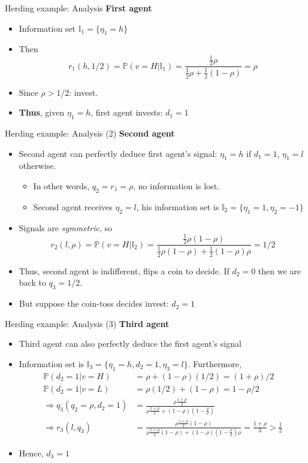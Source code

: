 \documentclass[english,10pt
,aspectratio=169
]{beamer}
\begin{document}
\begin{frame}{Herding example: Analysis}
	\textbf{First agent}
	\begin{itemize}
		\item Information set $\mathbb{I}_1=\{\eta_1=h\}$
		\item Then
		\[
			r_1(h,1/2) = \mathbb{P}(v=H|\mathbb{I}_1) = \frac{\frac{1}{2} \rho}{\frac{1}{2} \rho+\frac{1}{2} (1- \rho)} = \rho 
		\]
		\item Since $\rho>1/2$: invest.
		\item \textbf{Thus}, given $\eta_1=h$, first agent invests: $d_1=1$
	\end{itemize}
\end{frame}


\begin{frame}{Herding example: Analysis (2)}
	\textbf{Second agent}
	\begin{itemize}
		\item Second agent can perfectly deduce first agent's signal: $\eta_1=h$ if $d_1=1$, $\eta_1=l$ otherwise.
		\begin{itemize}
			\item In other words, $q_2 = r_1 = \rho$, no information is lost.
			\item Second agent receives $\eta_2=l$, his information set is $\mathbb{I}_2=\{\eta_1=1,\eta_2=-1\}$
		\end{itemize}
		\item Signals are \emph{symmetric}, so
		\[ r_2(l,\rho) = \mathbb{P}(v=H|\mathbb{I}_2) = \frac{\frac{1}{2} \rho(1-\rho)}{\frac{1}{2} \rho(1-\rho)+\frac{1}{2} (1-\rho)\rho} = 1/2 \]
		\item Thus, second agent is indifferent, flips a coin to decide. If $d_2 = 0$ then we are back to $q_3=1/2$.
		\item But suppose the coin-toss decides invest: $d_2=1$
	\end{itemize}
\end{frame}


\begin{frame}{Herding example: Analysis (3)}
	\textbf{Third agent}
	\begin{itemize}
		\item Third agent can also perfectly deduce the first agent's signal
		\item Information set is $\mathbb{I}_3=\{\eta_1=h, d_2=1, \eta_3=l\}$. Furthermore,  
		\begin{align*}
		\mathbb{P}(d_2=1|v=H)	&= \rho +(1-\rho) (1/2)=(1+\rho)/2\\
		\mathbb{P}(d_2=1|v=L)	&= \rho(1/2) +(1-\rho)=1-\rho/2
		\\
		\Rightarrow q_3(q_2=\rho,d_2=1) &= \frac{\rho \frac{1+\rho}{2}}{\rho \frac{1+\rho}{2} + (1-\rho) \left(1-\frac{\rho}{2}\right)}
		\\
		\Rightarrow r_3(l,q_3) &= 
		 \frac{\rho \frac{1+\rho}{2}(1-\rho)}{\rho\frac{1+\rho}{2}(1-\rho) + (1-\rho) \left(1-\frac{\rho}{2}\right)\rho} 
		=\frac{1+\rho}{3}>\frac{1}{2}
		\end{align*}
		\item Hence, $d_3=1$
	\end{itemize}
\end{frame}
\end{document}
